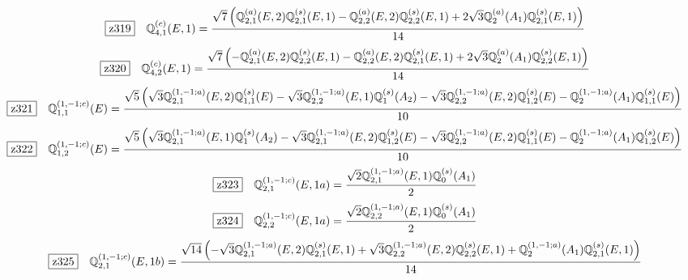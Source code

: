 \documentclass[fleqn,10pt,landscape]{jsarticle}
\begin{document}
\begin{dmath*}
\hspace*{3mm}\fbox{z319}\quad \mathbb{Q}_{4,1}^{(c)}(E,1)=\frac{\sqrt{7} \left(\mathbb{Q}_{2,1}^{(a)}(E,2) \mathbb{Q}_{2,1}^{(s)}(E,1) - \mathbb{Q}_{2,2}^{(a)}(E,2) \mathbb{Q}_{2,2}^{(s)}(E,1) + 2 \sqrt{3} \mathbb{Q}_{2}^{(a)}(A_{1}) \mathbb{Q}_{2,1}^{(s)}(E,1)\right)}{14}
\end{dmath*}
\begin{dmath*}
\hspace*{3mm}\fbox{z320}\quad \mathbb{Q}_{4,2}^{(c)}(E,1)=\frac{\sqrt{7} \left(- \mathbb{Q}_{2,1}^{(a)}(E,2) \mathbb{Q}_{2,2}^{(s)}(E,1) - \mathbb{Q}_{2,2}^{(a)}(E,2) \mathbb{Q}_{2,1}^{(s)}(E,1) + 2 \sqrt{3} \mathbb{Q}_{2}^{(a)}(A_{1}) \mathbb{Q}_{2,2}^{(s)}(E,1)\right)}{14}
\end{dmath*}
\begin{dmath*}
\hspace*{3mm}\fbox{z321}\quad \mathbb{Q}_{1,1}^{(1,-1;c)}(E)=\frac{\sqrt{5} \left(\sqrt{3} \mathbb{Q}_{2,1}^{(1,-1;a)}(E,2) \mathbb{Q}_{1,1}^{(s)}(E) - \sqrt{3} \mathbb{Q}_{2,2}^{(1,-1;a)}(E,1) \mathbb{Q}_{1}^{(s)}(A_{2}) - \sqrt{3} \mathbb{Q}_{2,2}^{(1,-1;a)}(E,2) \mathbb{Q}_{1,2}^{(s)}(E) - \mathbb{Q}_{2}^{(1,-1;a)}(A_{1}) \mathbb{Q}_{1,1}^{(s)}(E)\right)}{10}
\end{dmath*}
\begin{dmath*}
\hspace*{3mm}\fbox{z322}\quad \mathbb{Q}_{1,2}^{(1,-1;c)}(E)=\frac{\sqrt{5} \left(\sqrt{3} \mathbb{Q}_{2,1}^{(1,-1;a)}(E,1) \mathbb{Q}_{1}^{(s)}(A_{2}) - \sqrt{3} \mathbb{Q}_{2,1}^{(1,-1;a)}(E,2) \mathbb{Q}_{1,2}^{(s)}(E) - \sqrt{3} \mathbb{Q}_{2,2}^{(1,-1;a)}(E,2) \mathbb{Q}_{1,1}^{(s)}(E) - \mathbb{Q}_{2}^{(1,-1;a)}(A_{1}) \mathbb{Q}_{1,2}^{(s)}(E)\right)}{10}
\end{dmath*}
\begin{dmath*}
\hspace*{3mm}\fbox{z323}\quad \mathbb{Q}_{2,1}^{(1,-1;c)}(E,1a)=\frac{\sqrt{2} \mathbb{Q}_{2,1}^{(1,-1;a)}(E,1) \mathbb{Q}_{0}^{(s)}(A_{1})}{2}
\end{dmath*}
\begin{dmath*}
\hspace*{3mm}\fbox{z324}\quad \mathbb{Q}_{2,2}^{(1,-1;c)}(E,1a)=\frac{\sqrt{2} \mathbb{Q}_{2,2}^{(1,-1;a)}(E,1) \mathbb{Q}_{0}^{(s)}(A_{1})}{2}
\end{dmath*}
\begin{dmath*}
\hspace*{3mm}\fbox{z325}\quad \mathbb{Q}_{2,1}^{(1,-1;c)}(E,1b)=\frac{\sqrt{14} \left(- \sqrt{3} \mathbb{Q}_{2,1}^{(1,-1;a)}(E,2) \mathbb{Q}_{2,1}^{(s)}(E,1) + \sqrt{3} \mathbb{Q}_{2,2}^{(1,-1;a)}(E,2) \mathbb{Q}_{2,2}^{(s)}(E,1) + \mathbb{Q}_{2}^{(1,-1;a)}(A_{1}) \mathbb{Q}_{2,1}^{(s)}(E,1)\right)}{14}
\end{dmath*}
\end{document}
